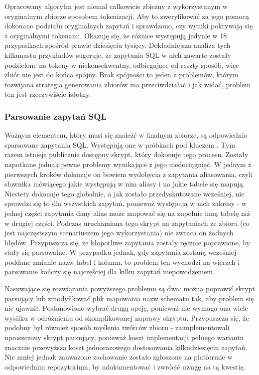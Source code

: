 Opracowany algorytm jest niemal całkowicie zbieżny z wykorzystanym w oryginalnym zbiorze  sposobem tokenizacji. Aby to zweryfikować za jego pomocą dokonano podziału oryginalnych zapytań i sprawdzono, czy wyniki pokrywają się z oryginalnymi tokenami. Okazuję się, że różnice występują jedynie w 18 przypadkach spośród prawie dziesięciu tysięcy. Dokładniejsza analiza tych kilkunastu przykładów sugeruje, że zapytania SQL w nich zawarte zostały podzielone na tokeny w niekonsekwentny, odbiegające od reszty sposób, więc zbiór  nie jest do końca spójny. Brak spójności to jeden z problemów, którym rozwijana strategia generowania zbiorów ma przeciwdziałać i jak widać, problem ten jest rzeczywiście istotny.

\subsubsection{Parsowanie zapytań SQL}
Ważnym elementem, który musi się znaleźć w finalnym zbiorze, są odpowiednio sparsowane zapytania SQL. Występują one w próbkach pod kluczem . Tym razem istnieje publicznie dostępny skrypt, który dokonuje tego procesu. Zostały napotkane jednak pewne problemy wynikające z jego niedociągnięć. W jednym z pierwszych kroków dokonuje on bowiem wydobycia z zapytania aliasowania, czyli słownika mówiącego jakie występują w nim aliasy i na jakie tabele się mapują. Niestety dokonuje tego globalnie, a jak zostało przedyskutowane wcześniej, nie sprawdzi się to dla wszystkich zapytań, ponieważ występują w nich zakresy - w jednej części zapytania dany alias może mapować się na zupełnie inną tabelę niż w drugiej części. Podczas uruchamiana tego skrypt na zapytaniach ze zbioru  (co jest najczęstszym scenariuszem jego wykorzystania) nie zwraca on żadnych błędów. Przypuszcza się, że kłopotliwe zapytania zostały ręcznie poprawione, by stały się parsowalne. W przypadku jednak, gdy zapytania zostaną wcześniej poddane zmianie nazw tabel i kolumn, to problem ten wychodzi na wierzch i parsowanie kończy się najczęściej dla kilku zapytań niepowodzeniem. 

Nasuwające się rozwiązania powyższego problemu są dwa: można poprawić skrypt parsujący lub zmodyfikować plik mapowania nazw schematu tak, aby problem się nie ujawnił. Postanowiono wybrać drugą opcję, ponieważ nie wymaga ona wiele wysiłku w odróżnieniu od skomplikowanej naprawy skryptu. Przypuszcza się, że podobny był również sposób myślenia twórców zbioru  - zaimplementowali uproszczony skrypt parsujący, ponieważ koszt implementacji pełnego wariantu znacznie przewyższa koszt jednorazowego dostosowania kilkudziesięciu zapytań. Nie mniej jednak zauważone zachowanie zostało zgłoszone na platformie  w odpowiednim repozytorium, by udokumentować i zwrócić uwagę na tą kwestię.

